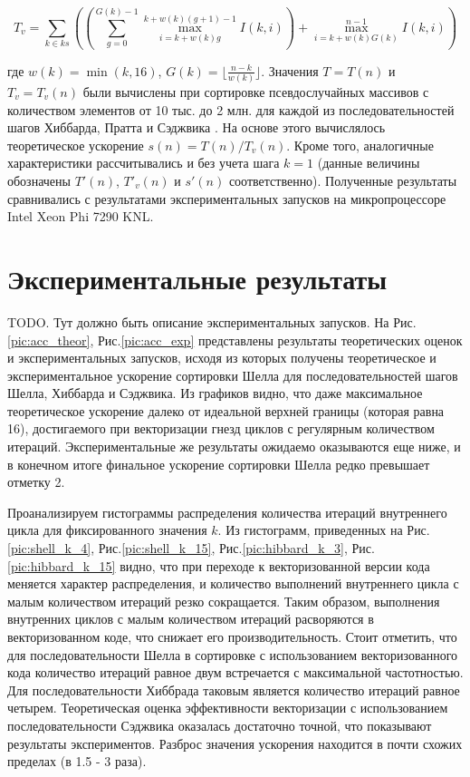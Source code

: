 \documentclass[utf8]{psta}
\begin{document}
\begin{equation}
T_v = \sum_{k \in ks}
{
\left(
\left(
\sum_{g = 0}^{G(k) - 1}{\max_{i = k + w(k)g}^{k + w(k)(g + 1) - 1}{I(k, i)}}
\right)
+ \max_{i = k + w(k)G(k)}^{n - 1}{I(k, i)}
\right)
}
\end{equation}

где $w(k) = \min(k, 16)$, $G(k) = \lfloor \frac{n - k}{w(k)} \rfloor$. 
Значения $T = T(n)$ и $T_v = T_v(n)$ были вычислены при сортировке псевдослучайных массивов с количеством элементов от 10 тыс. до 2 млн. для каждой из последовательностей шагов Хиббарда, Пратта и Сэджвика \cite{Pratt_seq,Hib_seq,Sedjw_seq}. 
На основе этого вычислялось теоретическое ускорение $s(n) = T(n)/T_v(n)$. 
Кроме того, аналогичные характеристики рассчитывались и без учета шага $k = 1$ (данные величины обозначены $T'(n)$, $T'_v(n)$ и $s'(n)$ соответственно). 
Полученные результаты сравнивались с результатами экспериментальных запусков на микропроцессоре Intel Xeon Phi 7290 KNL.

\section{Экспериментальные результаты}

TODO.
Тут должно быть описание экспериментальных запусков. 
На Рис.\ref{pic:acc_theor}, Рис.\ref{pic:acc_exp} представлены результаты теоретических оценок и экспериментальных запусков, исходя из которых получены теоретическое и экспериментальное ускорение сортировки Шелла для последовательностей шагов Шелла, Хиббарда и Сэджвика. 
Из графиков видно, что даже максимальное теоретическое ускорение далеко от идеальной верхней границы (которая равна 16), достигаемого при векторизации гнезд циклов с регулярным количеством итераций. 
Экспериментальные же результаты ожидаемо оказываются еще ниже, и в конечном итоге финальное ускорение сортировки Шелла редко превышает отметку 2.

Проанализируем гистограммы распределения количества итераций внутреннего цикла для фиксированного значения $k$. 
Из гистограмм, приведенных на Рис.\ref{pic:shell_k_4}, Рис.\ref{pic:shell_k_15}, Рис.\ref{pic:hibbard_k_3}, Рис.\ref{pic:hibbard_k_15} видно, что при переходе к векторизованной версии кода меняется характер распределения, и количество выполнений внутреннего цикла с малым количеством итераций резко сокращается. 
Таким образом, выполнения внутренних циклов с малым количеством итераций расворяются в векторизованном коде, что снижает его производительность.
Стоит отметить, что для последовательности Шелла в сортировке с использованием векторизованного кода количество итераций равное двум встречается с максимальной частотностью. 
Для последовательности Хиббрада таковым является количество итераций равное четырем.
Теоретическая оценка эффективности векторизации с использованием  последовательности Сэджвика оказалась достаточно точной, что показывают результаты экспериментов. Разброс значения ускорения находится в почти схожих пределах (в 1.5 - 3 раза).
\end{document}
